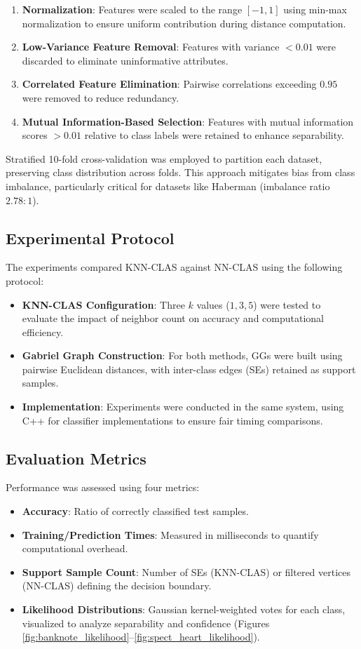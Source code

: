 \documentclass[conference]{IEEEtran}
\begin{document}
\begin{enumerate}
    \item \textbf{Normalization}: Features were scaled to the range \([-1, 1]\) using min-max normalization to ensure uniform contribution during distance computation.
    \item \textbf{Low-Variance Feature Removal}: Features with variance \(< 0.01\) were discarded to eliminate uninformative attributes.
    \item \textbf{Correlated Feature Elimination}: Pairwise correlations exceeding \(0.95\) were removed to reduce redundancy.
    \item \textbf{Mutual Information-Based Selection}: Features with mutual information scores \(> 0.01\) relative to class labels were retained to enhance separability.
\end{enumerate}

Stratified 10-fold cross-validation was employed to partition each dataset, preserving class distribution across folds. This approach mitigates bias from class imbalance, particularly critical for datasets like Haberman (imbalance ratio \(2.78:1\)).

\subsection{Experimental Protocol}
The experiments compared KNN-CLAS against NN-CLAS using the following protocol:

\begin{itemize}
    \item \textbf{KNN-CLAS Configuration}: Three \(k\) values (\(1, 3, 5\)) were tested to evaluate the impact of neighbor count on accuracy and computational efficiency.
    \item \textbf{Gabriel Graph Construction}: For both methods, GGs were built using pairwise Euclidean distances, with inter-class edges (SEs) retained as support samples.
    \item \textbf{Implementation}: Experiments were conducted in the same system, using C++ for classifier implementations to ensure fair timing comparisons.
\end{itemize}

\subsection{Evaluation Metrics}
Performance was assessed using four metrics:
\begin{itemize}
    \item \textbf{Accuracy}: Ratio of correctly classified test samples.
    \item \textbf{Training/Prediction Times}: Measured in milliseconds to quantify computational overhead.
    \item \textbf{Support Sample Count}: Number of SEs (KNN-CLAS) or filtered vertices (NN-CLAS) defining the decision boundary.
    \item \textbf{Likelihood Distributions}: Gaussian kernel-weighted votes for each class, visualized to analyze separability and confidence (Figures \ref{fig:banknote_likelihood}--\ref{fig:spect_heart_likelihood}).
\end{itemize}
\end{document}
